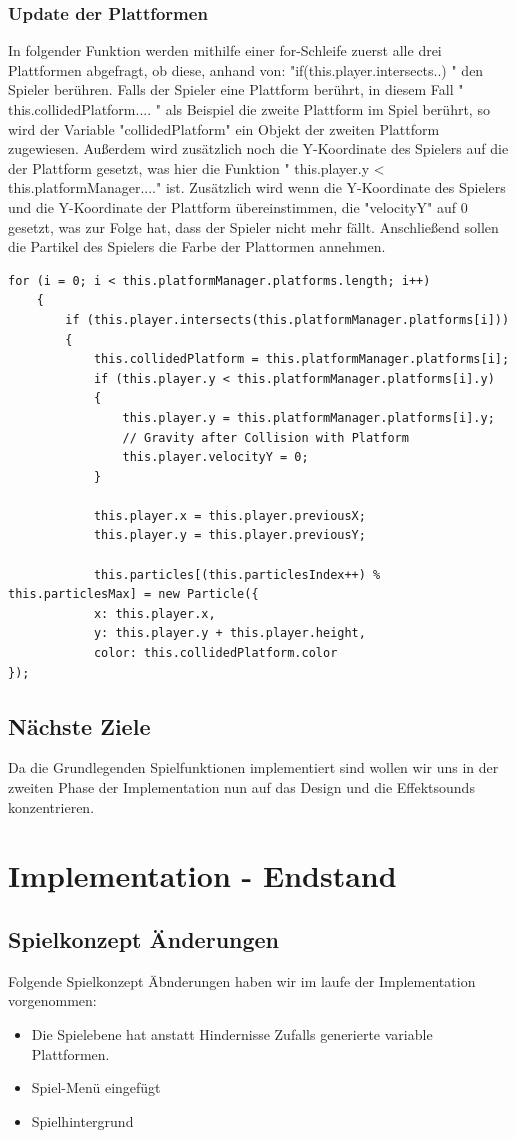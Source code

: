 \subsubsection{Update der Plattformen}
In folgender Funktion werden mithilfe einer for-Schleife zuerst alle drei Plattformen abgefragt, ob diese, anhand von: "if(this.player.intersects..) " den Spieler ber\"uhren. Falls der Spieler eine Plattform ber\"uhrt, in diesem Fall " this.collidedPlatform.... " als Beispiel die zweite Plattform im Spiel ber\"uhrt, so wird der Variable "collidedPlatform" ein Objekt der zweiten Plattform zugewiesen. Außerdem wird zus\"atzlich noch die Y-Koordinate des Spielers auf die der Plattform gesetzt, was hier die Funktion " this.player.y < this.platformManager...." ist. Zus\"atzlich wird wenn die Y-Koordinate des Spielers und die Y-Koordinate der Plattform \"ubereinstimmen, die "velocityY" auf 0 gesetzt, was zur Folge hat, dass der Spieler nicht mehr f\"allt. Anschließend sollen die Partikel des Spielers die Farbe der Plattormen annehmen.
\lstset{language=java}
\begin{lstlisting}[frame=single]
    for (i = 0; i < this.platformManager.platforms.length; i++) 
    {
		if (this.player.intersects(this.platformManager.platforms[i])) 
		{
			this.collidedPlatform = this.platformManager.platforms[i];
			if (this.player.y < this.platformManager.platforms[i].y) 
			{
				this.player.y = this.platformManager.platforms[i].y;
				// Gravity after Collision with Platform
				this.player.velocityY = 0;
			}

			this.player.x = this.player.previousX;
			this.player.y = this.player.previousY;
			
			this.particles[(this.particlesIndex++) % this.particlesMax] = new Particle({
			x: this.player.x,
			y: this.player.y + this.player.height,
			color: this.collidedPlatform.color
});
\end{lstlisting}
\subsection{Nächste Ziele}
Da die Grundlegenden Spielfunktionen implementiert sind wollen wir uns in der zweiten Phase der Implementation nun auf das Design und die Effektsounds konzentrieren.
\section{Implementation - Endstand}
\subsection{Spielkonzept Änderungen}
Folgende Spielkonzept Äbnderungen haben wir im laufe der Implementation vorgenommen:
\begin{itemize}
	\item Die Spielebene hat anstatt Hindernisse Zufalls generierte variable Plattformen.
	\item Spiel-Menü eingefügt
	\item Spielhintergrund
\end{itemize}
